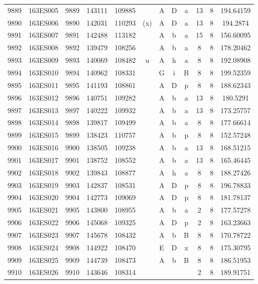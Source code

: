 \begin{tabular}{|*{12}{c|}}
9889 & 163ES005 & 9889 & 143111 & 109885 &  & A & D & a & 13 & 8 & 194.64159 \\ 
9890 & 163ES006 & 9890 & 142031 & 110293 & (x) & A & D & a & 13 & 8 & 194.2874 \\ 
9891 & 163ES007 & 9891 & 142488 & 113182 &  & A & b & a & 15 & 8 & 156.60095 \\ 
9892 & 163ES008 & 9892 & 139479 & 108256 &  & A & b & a & 8 & 8 & 178.20462 \\ 
9893 & 163ES009 & 9893 & 140069 & 108482 & u & A & h & a & 8 & 8 & 192.08908 \\ 
9894 & 163ES010 & 9894 & 140962 & 108331 &  & G & i & B & 8 & 8 & 199.52359 \\ 
9895 & 163ES011 & 9895 & 141193 & 108861 &  & A & D & p & 8 & 8 & 188.62343 \\ 
9896 & 163ES012 & 9896 & 140751 & 109282 &  & A & b & a & 13 & 8 & 180.5291 \\ 
9897 & 163ES013 & 9897 & 140222 & 109932 &  & A & b & a & 13 & 8 & 173.25757 \\ 
9898 & 163ES014 & 9898 & 139817 & 109499 &  & A & b & a & 8 & 8 & 177.66614 \\ 
9899 & 163ES015 & 9899 & 138423 & 110757 &  & A & b & p & 8 & 8 & 152.57248 \\ 
9900 & 163ES016 & 9900 & 138505 & 109238 &  & A & b & a & 13 & 8 & 168.51215 \\ 
9901 & 163ES017 & 9901 & 138752 & 108552 &  & A & b & a & 13 & 8 & 165.46445 \\ 
9902 & 163ES018 & 9902 & 139843 & 108877 &  & A & h & a & 8 & 8 & 188.27426 \\ 
9903 & 163ES019 & 9903 & 142837 & 108531 &  & A & D & p & 8 & 8 & 196.78833 \\ 
9904 & 163ES020 & 9904 & 142773 & 109069 &  & A & D & p & 8 & 8 & 181.78137 \\ 
9905 & 163ES021 & 9905 & 143800 & 108955 &  & A & b & a & 2 & 8 & 177.57278 \\ 
9906 & 163ES022 & 9906 & 145068 & 109325 &  & A & D & p & 2 & 8 & 163.23663 \\ 
9907 & 163ES023 & 9907 & 145678 & 108432 &  & A & b & B & 8 & 8 & 170.78722 \\ 
9908 & 163ES024 & 9908 & 144922 & 108470 &  & E & D & x & 8 & 8 & 175.30795 \\ 
9909 & 163ES025 & 9909 & 144739 & 108473 &  & A & b & B & 8 & 8 & 186.51953 \\ 
9910 & 163ES026 & 9910 & 143646 & 108314 &  &  &  &  & 2 & 8 & 189.91751 \\ 

\end{tabular}
